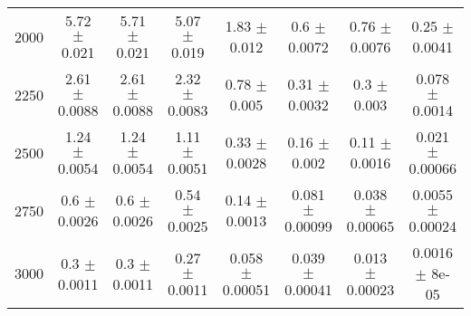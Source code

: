 \begin{footnotesize}
\begin{tabular}{c|c|c|c|c|c|c|c}
2000 & 5.72 $\pm$ 0.021 & 5.71 $\pm$ 0.021 & 5.07 $\pm$ 0.019 & 1.83 $\pm$ 0.012 & 0.6 $\pm$ 0.0072 & 0.76 $\pm$ 0.0076 & 0.25 $\pm$ 0.0041\\ 
2250 & 2.61 $\pm$ 0.0088 & 2.61 $\pm$ 0.0088 & 2.32 $\pm$ 0.0083 & 0.78 $\pm$ 0.005 & 0.31 $\pm$ 0.0032 & 0.3 $\pm$ 0.003 & 0.078 $\pm$ 0.0014\\ 
2500 & 1.24 $\pm$ 0.0054 & 1.24 $\pm$ 0.0054 & 1.11 $\pm$ 0.0051 & 0.33 $\pm$ 0.0028 & 0.16 $\pm$ 0.002 & 0.11 $\pm$ 0.0016 & 0.021 $\pm$ 0.00066\\ 
2750 & 0.6 $\pm$ 0.0026 & 0.6 $\pm$ 0.0026 & 0.54 $\pm$ 0.0025 & 0.14 $\pm$ 0.0013 & 0.081 $\pm$ 0.00099 & 0.038 $\pm$ 0.00065 & 0.0055 $\pm$ 0.00024\\ 
3000 & 0.3 $\pm$ 0.0011 & 0.3 $\pm$ 0.0011 & 0.27 $\pm$ 0.0011 & 0.058 $\pm$ 0.00051 & 0.039 $\pm$ 0.00041 & 0.013 $\pm$ 0.00023 & 0.0016 $\pm$ 8e-05\\ 
\hline\hline 
\end{tabular} 
\end{footnotesize} 
\newline 
